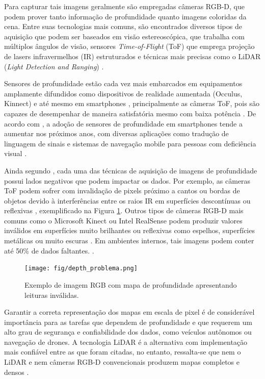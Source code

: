 Para capturar tais imagens geralmente são empregadas câmeras RGB-D, que podem prover tanto informação de profundidade quanto imagens coloridas da cena. Entre suas tecnologias mais comuns, são encontrados diversos tipos de aquisição que podem ser baseados em visão estereoscópica, que trabalha com múltiplos ângulos de visão, sensores \textit{Time-of-Flight} (ToF) que emprega projeção de lasers infravermelhos (IR) estruturados e técnicas mais precisas como o LiDAR (\textit{Light Detection and Ranging}) \cite{castellano2023performance}.


Sensores de profundidade estão cada vez mais embarcados em equipamentos amplamente difundidos como dispositivos de realidade aumentada (Occulus, Kinnect) e até mesmo em smartphones \cite{du2020depthlab}, principalmente as câmeras ToF, pois são capazes de desempenhar de maneira satisfatória mesmo com baixa potência \cite{branscombe2018microsoft}. De acordo com \cite{xie2021ultradepth}, a adoção de sensores de profundidade em smartphones tende a aumentar nos próximos anos, com diversas aplicações como tradução de linguagem de sinais \cite{park2021enabling} e sistemas de navegação mobile para pessoas com deficiência visual \cite{see2022smartphone}.


Ainda segundo \cite{castellano2023performance}, cada uma das técnicas de aquisição de imagens de profundidade possui lados negativos que podem impactar os dados. Por exemplo, as câmeras ToF podem sofrer com invalidação de pixels próximo a cantos ou bordas de objetos devido à interferências entre os raios IR em superfícies descontínuas ou reflexivas \cite{hansard2012time}, exemplificado na Figura \ref{errdepth}. Outros tipos de câmeras RGB-D mais comuns como o Microsoft Kinect ou Intel RealSense podem produzir valores inválidos em superfícies muito brilhantes ou reflexivas como espelhos, superfícies metálicas ou muito escuras \cite{zollhofer2019commodity}. Em ambientes internos, tais imagens podem conter até 50\% de dados faltantes. \cite{zhang2022indepth} \cite{zhang2018deep}. 

\begin{figure}
    \centering   
    \texttt{[image: fig/depth\_problema.png]}
    \caption{Exemplo de imagem RGB com mapa de profundidade apresentando leituras inválidas.}
    \label{errdepth}
\end{figure}


Garantir a correta representação dos mapas em escala de pixel é de considerável importância para as tarefas que dependem de profundidade e que requerem um alto grau de segurança e confiabilidade dos dados, como veículos autônomos ou navegação de drones. A tecnologia LiDAR é a alternativa com implementação mais confiável entre as que foram citadas, no entanto, ressalta-se que nem o LiDAR e nem câmeras RGB-D convencionais produzem mapas completos e densos \cite{hu2012robust}. 

